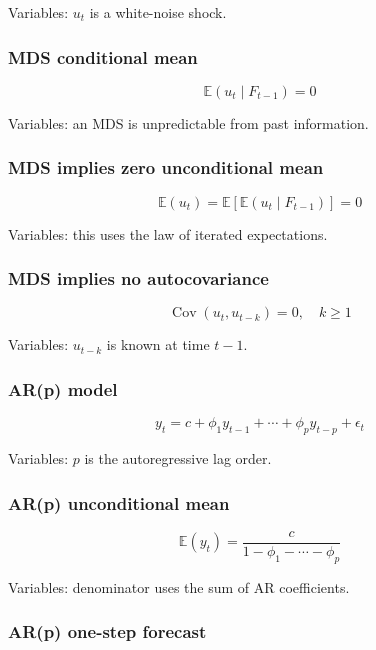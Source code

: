 \documentclass[
  8pt,
  twocolumn]{extarticle}
\begin{document}
Variables: \(u_t\) is a white-noise shock.

\subsubsection{MDS conditional mean}\label{mds-conditional-mean}

\[
\mathbb E(u_t\mid F_{t-1})=0
\]

Variables: an MDS is unpredictable from past information.

\subsubsection{MDS implies zero unconditional
mean}\label{mds-implies-zero-unconditional-mean}

\[
\mathbb E(u_t)=\mathbb E[\mathbb E(u_t\mid F_{t-1})]=0
\]

Variables: this uses the law of iterated expectations.

\subsubsection{MDS implies no
autocovariance}\label{mds-implies-no-autocovariance}

\[
\operatorname{Cov}(u_t,u_{t-k})=0,\quad k\ge1
\]

Variables: \(u_{t-k}\) is known at time \(t-1\).

\subsubsection{AR(p) model}\label{arp-model}

\[
y_t=c+\phi_1y_{t-1}+\cdots+\phi_py_{t-p}+\epsilon_t
\]

Variables: \(p\) is the autoregressive lag order.

\subsubsection{AR(p) unconditional mean}\label{arp-unconditional-mean}

\[
\mathbb E(y_t)=\frac{c}{1-\phi_1-\cdots-\phi_p}
\]

Variables: denominator uses the sum of AR coefficients.

\subsubsection{AR(p) one-step forecast}\label{arp-one-step-forecast}
\end{document}
